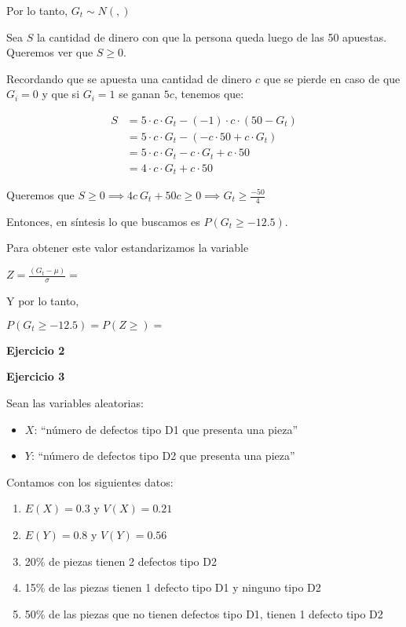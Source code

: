 \documentclass[11pt]{article}
\begin{document}
Por lo tanto, 
$ G_t \sim N(,)$

Sea $S$ la cantidad de dinero con que la persona queda luego de las 50 apuestas. Queremos ver que $S\geq 0$. 

Recordando que se apuesta una cantidad de dinero $c$ que se pierde en caso de que $G_i=0$ y que si $G_i=1$ se ganan $5c$, tenemos que:

\begin{align*}
    S &= 5\cdot c \cdot G_t - (-1)\cdot c\cdot (50 - G_t) \\
      &= 5\cdot c \cdot G_t - (-c \cdot 50 + c\cdot G_t) \\
      &= 5\cdot c \cdot G_t - c\cdot G_t + c\cdot 50 \\
      &= 4\cdot c \cdot G_t + c\cdot 50
\end{align*}

Queremos que $S \geq 0 \implies 4c \ G_t + 50c \geq 0 \implies G_t \geq \frac{-50}{4}$  

Entonces, en s\'intesis lo que buscamos es $P(G_t\geq -12.5)$. 

Para obtener este valor estandarizamos la variable 

$ Z = \frac{(G_t - \mu)}{\sigma} = $

Y por lo tanto,

$P(G_t\geq -12.5) = P(Z \geq ) = $


\textbf{Ejercicio 2}



\textbf{Ejercicio 3}

Sean las variables aleatorias:
\begin{itemize}
    \item $X$: ``n\'umero de defectos tipo D1 que presenta una pieza''
    \item $Y$: ``n\'umero de defectos tipo D2 que presenta una pieza''
\end{itemize}
Contamos con los siguientes datos:
\begin{enumerate}
    \item $E(X) = 0.3$ y $V(X) = 0.21$
    \item $E(Y) = 0.8$ y $V(Y) = 0.56$
    \item 20\% de piezas tienen 2 defectos tipo D2
    \item 15\% de las piezas tienen 1 defecto tipo D1 y ninguno tipo D2
    \item 50\% de las piezas que no tienen defectos tipo D1, tienen 1 defecto tipo D2
\end{enumerate}
\end{document}
